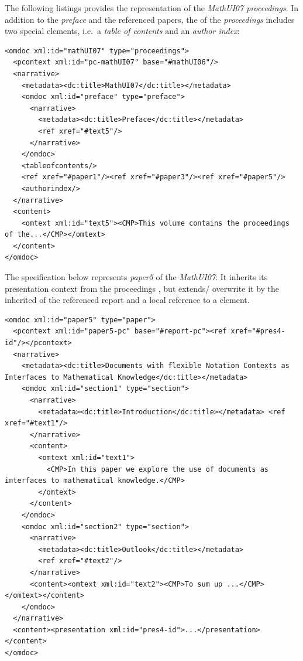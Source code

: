 \documentclass[pdftex,bibtotocnumbered,idxtotoc,11pt]{scrartcl}
\begin{document}
The following listings provides the {\omdoc} representation of the {\emph{MathUI07
proceedings}}. In addition to the {\emph{preface}} and the referenced papers, the
{} of the {\emph{proceedings}} includes two special elements,
i.e.\ a {\emph{table of contents}} and an {\emph{author index}}:
\begin{lstlisting}[mathescape,caption={Representation of the MathUI
proceedings},label=lst:MathUIproceedings]
<omdoc xml:id="mathUI07" type="proceedings">
  <pcontext xml:id="pc-mathUI07" base="#mathUI06"/>
  <narrative>
    <metadata><dc:title>MathUI07</dc:title></metadata>
    <omdoc xml:id="preface" type="preface">
      <narrative>
        <metadata><dc:title>Preface</dc:title></metadata>
        <ref xref="#text5"/>
      </narrative>
    </omdoc>
    <tableofcontents/>
    <ref xref="#paper1"/><ref xref="#paper3"/><ref xref="#paper5"/>
    <authorindex/>
  </narrative>
  <content>
    <omtext xml:id="text5"><CMP>This volume contains the proceedings of the...</CMP></omtext>
  </content>
</omdoc>
\end{lstlisting}

The {\omdoc} specification below represents {\emph{paper5}} of the {\emph{MathUI07}}: It
inherits its presentation context from the proceedings {}, but extends/
overwrite it by the inherited {} of the referenced report and a local
reference to a {} element.

\begin{lstlisting}[mathescape] 
<omdoc xml:id="paper5" type="paper">
  <pcontext xml:id="paper5-pc" base="#report-pc"><ref xref="#pres4-id"/></pcontext>
  <narrative>
    <metadata><dc:title>Documents with flexible Notation Contexts as Interfaces to Mathematical Knowledge</dc:title></metadata>
    <omdoc xml:id="section1" type="section">
      <narrative>
        <metadata><dc:title>Introduction</dc:title></metadata> <ref xref="#text1"/>
      </narrative>
      <content>
        <omtext xml:id="text1">
          <CMP>In this paper we explore the use of documents as interfaces to mathematical knowledge.</CMP>
        </omtext>
      </content>
    </omdoc>
    <omdoc xml:id="section2" type="section">
      <narrative>
        <metadata><dc:title>Outlook</dc:title></metadata>
        <ref xref="#text2"/>
      </narrative>
      <content><omtext xml:id="text2"><CMP>To sum up ...</CMP></omtext></content>
    </omdoc> 
  </narrative>
  <content><presentation xml:id="pres4-id">...</presentation></content>
</omdoc>
\end{lstlisting}
\end{document}
